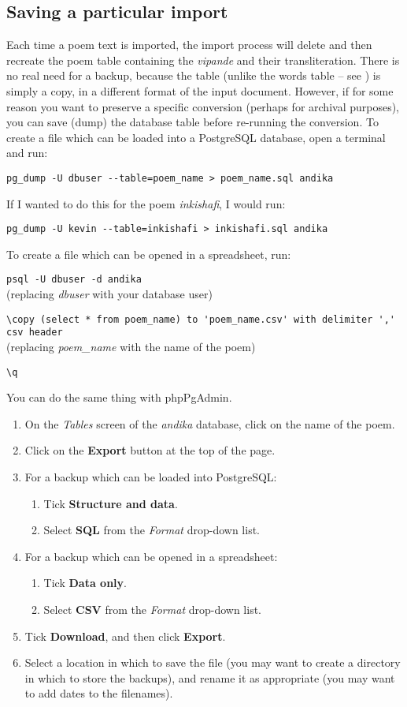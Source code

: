\subsection{Saving a particular import}

Each time a poem text is imported, the import process will delete and then recreate the poem table containing the \textit{vipande} and their transliteration.  There is no real need for a backup, because the table (unlike the words table -- see ) is simply a copy, in a different format of the input document.  However, if for some reason you want to preserve a specific conversion (perhaps for archival purposes), you can save (dump) the database table before re-running the conversion.  To create a file which can be loaded into a PostgreSQL database, open a terminal and run:

\verb|pg_dump -U dbuser --table=poem_name > poem_name.sql andika|

If I wanted to do this for the poem \textit{inkishafi}, I would run:

\verb|pg_dump -U kevin --table=inkishafi > inkishafi.sql andika|

To create a file which can be opened in a spreadsheet, run:

\verb|psql -U dbuser -d andika|\\
(replacing \textit{dbuser} with your database user)

\verb|\copy (select * from poem_name) to 'poem_name.csv' with delimiter ',' csv header|\\
(replacing \textit{poem_name} with the name of the poem)

\verb|\q|

You can do the same thing with phpPgAdmin.  
\begin{enumerate}
\item On the \textit{Tables} screen of the \textit{andika} database, click on the name of the poem.
\item Click on the \textbf{Export} button at the top of the page.
\item For a backup which can be loaded into PostgreSQL:
	\begin{enumerate}
    \item Tick \textbf{Structure and data}.
    \item Select \textbf{SQL} from the \textit{Format} drop-down list.
	\end{enumerate}
\item For a backup which can be opened in a spreadsheet:
	\begin{enumerate}
    \item Tick \textbf{Data only}.
    \item Select \textbf{CSV} from the \textit{Format} drop-down list.
	\end{enumerate}
\item Tick \textbf{Download}, and then click \textbf{Export}.
\item Select a location in which to save the file (you may want to create a directory in which to store the backups), and rename it as appropriate (you may want to add dates to the filenames).
\end{enumerate}

